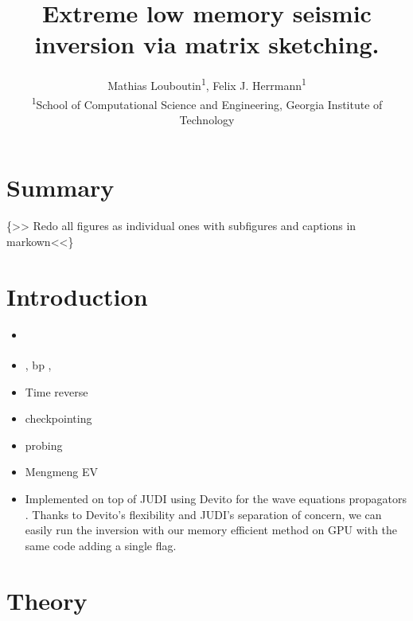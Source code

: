 \documentclass[]{segabs}
\title{Extreme low memory seismic inversion via matrix sketching.}
\author{Mathias Louboutin\textsuperscript{1}, Felix J.
Herrmann\textsuperscript{1}\\\textsuperscript{1}School of Computational
Science and Engineering, Georgia Institute of Technology\\}
\date{}
\begin{document}
\maketitle




\section{Summary}\label{summary}

\{\textgreater{}\textgreater{} Redo all figures as individual ones with
subfigures and captions in markown\textless{}\textless{}\}

\section{Introduction}\label{introduction}

\begin{itemize}
\item
  \citet{louboutin2015segtcs}
\item
  \citet{witte2018cls}, bp \citep{Sirgue2010}, \citep{Nihei2007}
\item
  Time reverse \citep[\citet{Mittet}, \citet{RaknesR45}]{McMechan}
\item
  checkpointing \citep[\citet{Symes2007}, \citet{kukrejacomp}]{Griewank}
\item
  probing \citep[\citet{hutchpp}]{Avron}
\item
  Mengmeng EV \citep[\citet{yang2020lrpo}]{vanleeuwen2015GPWEMVA}
\item
  Implemented on top of JUDI \citep{witte2018alf} using Devito for the
  wave equations propagators
  \citep[\citet{devito-compiler}]{devito-api}. Thanks to Devito's
  flexibility and JUDI's separation of concern, we can easily run the
  inversion with our memory efficient method on GPU with the same code
  adding a single flag.
\end{itemize}

\section{Theory}\label{theory}
\end{document}
